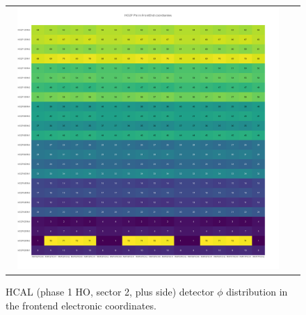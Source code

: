 \begin{figure}[htb]
 \begin{center}
  \begin{tabular}{cc}
   \includegraphics[angle=0,width=0.95\textwidth]{figures/appendix/HO2P_Phi_in_FrontEnd.png}
  \end{tabular}
  \caption{HCAL (phase 1 HO, sector 2, plus side) detector $\phi$ distribution in the frontend electronic coordinates.}
  \label{fig:lmapHO2PPhiFEC}
 \end{center}
\end{figure}
\clearpage

